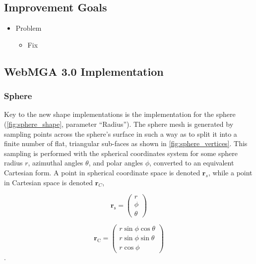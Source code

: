 \subsection{Improvement Goals}
\begin{itemize}
  \item Problem
    \begin{itemize}
      \item Fix
    \end{itemize}
\end{itemize}

\subsection{WebMGA 3.0 Implementation}
\subsubsection{Sphere}
\label{sphere_gen_sec}
Key to the new shape implementations is the implementation for the sphere (\cref{fig:sphere_shape}, parameter ``Radius''). The sphere mesh is generated by sampling points across the sphere's surface in such a way as to split it into a finite number of flat, triangular sub-faces as shown in \cref{fig:sphere_vertices}. This sampling is performed with the spherical coordinates system for some sphere radius $r$, azimuthal angles $\theta$, and polar angles $\phi$, converted to an equivalent Cartesian form. A point in spherical coordinate space is denoted $\mathbf{r}_{s}$, while a point in Cartesian space is denoted $\mathbf{r}_{C}$,

\begin{equation}
\mathbf{r}_\mathrm{s}=\begin{pmatrix}r\\\phi\\\theta\end{pmatrix}
\label{sphere_equation_spherical}
\end{equation}

\begin{equation}
\mathbf{r}_\mathrm{C}=\begin{pmatrix}r\sin\phi \cos\theta\\
r\sin\phi \sin\theta\\
r\cos\phi\end{pmatrix}
\label{sphere_equation_cartesian}
\end{equation}.

